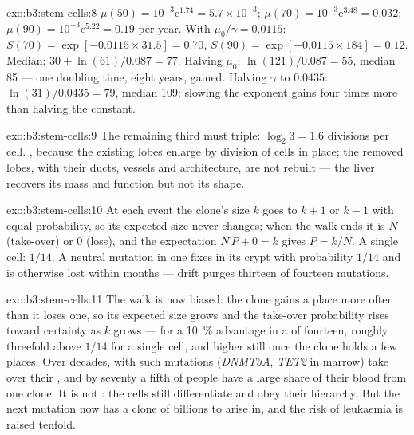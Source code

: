 \begin{solution}{exo:b3:stem-cells:8}
$\mu(50) = 10^{-3}\mathrm{e}^{1.74} = 5.7\times 10^{-3}$; $\mu(70) =
10^{-3}\mathrm{e}^{3.48} = 0.032$; $\mu(90) = 10^{-3}\mathrm{e}^{5.22} =
0.19$ per year. With $\mu_{0}/\gamma = 0.0115$: $S(70) = \exp[-0.0115
\times 31.5] = 0.70$, $S(90) = \exp[-0.0115\times 184] = 0.12$. Median:
$30 + \ln(61)/0.087 = 77$. Halving $\mu_{0}$: $\ln(121)/0.087 = 55$,
median 85 --- one doubling time, eight years, gained. Halving $\gamma$
to $0.0435$: $\ln(31)/0.0435 = 79$, median 109: slowing the exponent
gains four times more than halving the constant.
\end{solution}

\begin{solution}{exo:b3:stem-cells:9}
The remaining third must triple: $\log_{2}3 = 1.6$ divisions per cell.
, because the existing lobes enlarge by division of
cells in place; the removed lobes, with their ducts, vessels and
architecture, are not rebuilt --- the liver recovers its mass and
function but not its shape.
\end{solution}

\begin{solution}{exo:b3:stem-cells:10}
At each event the clone's size $k$ goes to $k + 1$ or $k - 1$ with equal
probability, so its expected size never changes; when the walk ends it
is $N$ (take-over) or $0$ (loss), and the expectation $N\,P + 0 = k$
gives $P = k/N$. A single cell: $1/14$. A neutral mutation in one  fixes in its crypt with probability $1/14$ and is otherwise lost
within months --- drift purges thirteen of fourteen mutations.
\end{solution}

\begin{solution}{exo:b3:stem-cells:11}
The walk is now biased: the clone gains a place more often than it
loses one, so its expected size grows and the take-over probability
rises toward certainty as $k$ grows --- for a \qty{10}{\%} advantage in
a  of fourteen, roughly threefold above $1/14$ for a single cell,
and higher still once the clone holds a few places. Over decades,  with such mutations (\emph{DNMT3A}, \emph{TET2} in marrow) take
over their , and by seventy a fifth of people have a large share
of their blood from one clone. It is not : the cells still
differentiate and obey their hierarchy. But the next mutation now has
a clone of billions to arise in, and the risk of leukaemia is raised
tenfold.
\end{solution}

